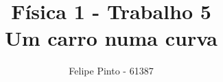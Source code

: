 \documentclass[12pt]{article}
\begin{document}
\title{\bfseries\color{DarkGreen!75!}Física 1 - Trabalho 5\\Um carro numa curva}
\author{Felipe Pinto - 61387}

\maketitle
\tableofcontents
\break
\end{document}
